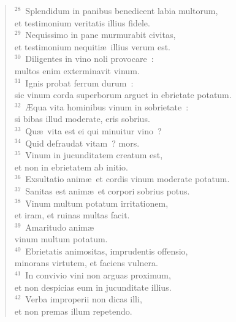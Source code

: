 \begin{verse}
${}^{28}$~Splendidum in panibus benedicent labia multorum,\\ et testimonium veritatis illius fidele.\\
${}^{29}$~Nequissimo in pane murmurabit civitas,\\ et testimonium nequiti\ae\ illius verum est.\\
${}^{30}$~Diligentes in vino noli provocare~:\\ multos enim exterminavit vinum.\\
${}^{31}$~Ignis probat ferrum durum~:\\ sic vinum corda superborum arguet in ebrietate potatum.\\
${}^{32}$~\AE qua vita hominibus vinum in sobrietate~:\\ si bibas illud moderate, eris sobrius.\\
${}^{33}$~Qu\ae\ vita est ei qui minuitur vino~?\\
${}^{34}$~Quid defraudat vitam~? mors.\\
${}^{35}$~Vinum in jucunditatem creatum est,\\ et non in ebrietatem ab initio.\\
${}^{36}$~Exsultatio anim\ae\ et cordis vinum moderate potatum.\\
${}^{37}$~Sanitas est anim\ae\ et corpori sobrius potus.\\
${}^{38}$~Vinum multum potatum irritationem,\\ et iram, et ruinas multas facit.\\
${}^{39}$~Amaritudo anim\ae \\ vinum multum potatum.\\
${}^{40}$~Ebrietatis animositas, imprudentis offensio,\\ minorans virtutem, et faciens vulnera.\\
${}^{41}$~In convivio vini non arguas proximum,\\ et non despicias eum in jucunditate illius.\\
${}^{42}$~Verba improperii non dicas illi,\\ et non premas illum repetendo.\end{verse}


